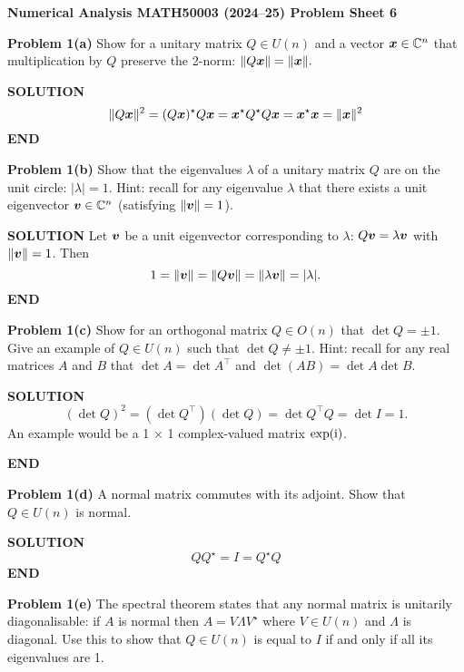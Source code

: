 \documentclass[12pt,a4paper]{article}
\def\endash{–}
\def\bbC{ {\mathbb C} }
\def\x{ {\vc x} }
\def\v{ {\vc v} }
\begin{document}
\textbf{Numerical Analysis MATH50003 (2024\ensuremath{\endash}25) Problem Sheet 6}

\textbf{Problem 1(a)} Show for a unitary matrix $Q \ensuremath{\in} U(n)$ and a vector $\ensuremath{\bm{\x}} \ensuremath{\in} \ensuremath{\bbC}^n$ that multiplication by $Q$ preserve the 2-norm: $\|Q \ensuremath{\bm{\x}}\| = \|\ensuremath{\bm{\x}}\|.$

\textbf{SOLUTION}
\[
\|Q \ensuremath{\bm{\x}}\|^2 = (Q \ensuremath{\bm{\x}})^\ensuremath{\star} Q \ensuremath{\bm{\x}} = \ensuremath{\bm{\x}}^\ensuremath{\star} Q^\ensuremath{\star} Q \ensuremath{\bm{\x}} = \ensuremath{\bm{\x}}^\ensuremath{\star}  \ensuremath{\bm{\x}} = \|\ensuremath{\bm{\x}}\|^2
\]
\textbf{END}

\textbf{Problem 1(b)} Show that the eigenvalues $\ensuremath{\lambda}$ of a unitary matrix $Q$ are on the unit circle: $|\ensuremath{\lambda}| = 1$. Hint: recall for any eigenvalue $\ensuremath{\lambda}$ that there exists a unit eigenvector $\ensuremath{\bm{\v}} \ensuremath{\in} \ensuremath{\bbC}^n$ (satisfying $\| \ensuremath{\bm{\v}} \| = 1$). 

\textbf{SOLUTION} Let $\ensuremath{\bm{\v}}$ be a unit eigenvector corresponding to $\ensuremath{\lambda}$: $Q \ensuremath{\bm{\v}} = \ensuremath{\lambda} \ensuremath{\bm{\v}}$ with $\|\ensuremath{\bm{\v}}\| = 1$. Then
\[
1 = \| \ensuremath{\bm{\v}} \| = \|Q \ensuremath{\bm{\v}} \| =  \| \ensuremath{\lambda} \ensuremath{\bm{\v}} \| = |\ensuremath{\lambda}|.
\]
\textbf{END}

\textbf{Problem 1(c)} Show for an orthogonal matrix $Q \ensuremath{\in} O(n)$ that $\det Q = \ensuremath{\pm}1$. Give an example of $Q \ensuremath{\in} U(n)$ such that $\det Q \ensuremath{\neq} \ensuremath{\pm}1$. Hint: recall for any real matrices $A$ and $B$ that $\det A = \det A^\ensuremath{\top}$ and $\det(AB) = \det A \det B$.

\textbf{SOLUTION}
\[
(\det Q)^2 = (\det Q^\ensuremath{\top})(\det Q) = \det Q^\ensuremath{\top}Q = \det I = 1.
\]
An example would be a 1 \ensuremath{\times} 1 complex-valued matrix $\exp({\rm i})$.

\textbf{END}

\textbf{Problem 1(d)} A normal matrix commutes with its adjoint. Show that $Q \ensuremath{\in} U(n)$ is normal.

\textbf{SOLUTION}
\[
 QQ^\ensuremath{\star} = I = Q^\ensuremath{\star}Q
\]
\textbf{END}

\textbf{Problem 1(e)}  The spectral theorem states that any normal matrix is unitarily diagonalisable: if $A$ is normal then $A = V \ensuremath{\Lambda} V^\ensuremath{\star}$ where $V \ensuremath{\in} U(n)$ and $\ensuremath{\Lambda}$ is diagonal. Use this to show that  $Q \ensuremath{\in} U(n)$ is equal to $I$ if and only if all its eigenvalues are 1.
\end{document}
